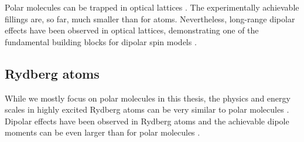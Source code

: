 Polar molecules can be trapped in optical lattices \cite{Chotia2012}. The experimentally achievable
fillings are, so far, much smaller than for atoms. Nevertheless, long-range dipolar effects have
been observed in optical lattices, demonstrating one of the fundamental building blocks for dipolar
spin models \cite{Yan2013}.

\subsection{Rydberg atoms}

While we mostly focus on polar molecules in this thesis, the physics and energy scales in highly
excited Rydberg atoms can be very similar to polar molecules \cite{Low2012}. Dipolar effects have
been observed in Rydberg atoms \cite{Westermann2006,Nipper2012b,Barredo2014,Ravets2015} and the
achievable dipole moments can be even larger than for polar molecules \cite{Booth2014}.


